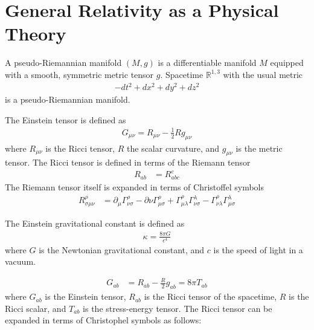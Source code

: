\documentclass[book.tex]{subfiles}
\begin{document}
\section{General Relativity as a Physical Theory}


A pseudo-Riemannian manifold $(M, g)$ is a differentiable manifold $M$ equipped with a smooth, symmetric metric tensor $g$. Spacetime $\mathbb{R}^{1,3}$ with the usual metric
\begin{align}
    -dt^2 + dx^2 + dy^2 + dz^2
\end{align}
is a pseudo-Riemannian manifold.


The Einstein tensor is defined as 
\begin{align}
    G_{\mu \nu} = R_{\mu \nu} - \frac{1}{2} R g_{\mu \nu} 
\end{align}
where $R_{\mu \nu}$ is the Ricci tensor, $R$ the scalar curvature, and $g_{\mu \nu}$ is the metric tensor. The Ricci tensor is defined in terms of the Riemann tensor
\begin{align}
R_{ab} &= R^{c}_{abc}
\end{align}
The Riemann tensor itself is expanded in terms of Christoffel symbols
\begin{align}
R^{\rho}_{\sigma \mu \nu} &= \partial_\mu \Gamma^\rho_{\nu \sigma} - \partial \nu \Gamma^\rho_{\mu \sigma} + \Gamma^\rho_{\mu \lambda} \Gamma^\lambda_{\nu \sigma} - \Gamma^\rho_{\nu \lambda} \Gamma^\lambda_{\mu \sigma}
\end{align}

The Einstein gravitational constant is defined as
\begin{align}
    \kappa = \frac{8 \pi G}{c^4}
\end{align}
where $G$ is the Newtonian gravitational constant, and $c$ is the speed of light in a vacuum.


\begin{align}
    G_{ab} &= R_{ab} - \frac{R}{2} g_{ab} = 8 \pi T_{ab}
\end{align}
where $G_{ab}$ is the Einstein tensor, $R_{ab}$ is the Ricci tensor of the spacetime, $R$ is the Ricci scalar, and $T_{ab}$ is the stress-energy tensor. The Ricci tensor can be expanded in terms of Christophel symbols as follows:
\end{document}
